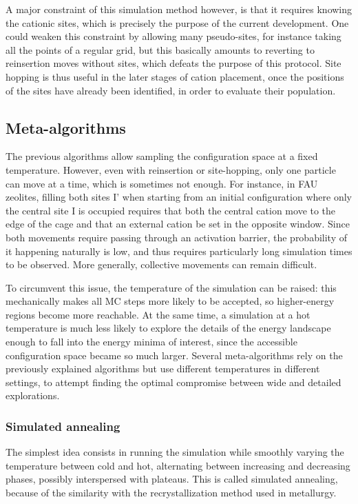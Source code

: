 \documentclass[main.tex]{subfiles}
\begin{document}
A major constraint of this simulation method however, is that it requires knowing the cationic sites, which is precisely the purpose of the current development. One could weaken this constraint by allowing many pseudo-sites, for instance taking all the points of a regular grid, but this basically amounts to reverting to reinsertion moves without sites, which defeats the purpose of this protocol. Site hopping is thus useful in the later stages of cation placement, once the positions of the sites have already been identified, in order to evaluate their population.


\subsection{Meta-algorithms}

The previous algorithms allow sampling the configuration space at a fixed temperature. However, even with reinsertion or site-hopping, only one particle can move at a time, which is sometimes not enough. For instance, in FAU zeolites, filling both sites I' when starting from an initial configuration where only the central site I is occupied requires that both the central cation move to the edge of the cage and that an external cation be set in the opposite window. Since both movements require passing through an activation barrier, the probability of it happening naturally is low, and thus requires particularly long simulation times to be observed. More generally, collective movements can remain difficult.

To circumvent this issue, the temperature of the simulation can be raised: this mechanically makes all MC steps more likely to be accepted, so higher-energy regions become more reachable. At the same time, a simulation at a hot temperature is much less likely to explore the details of the energy landscape enough to fall into the energy minima of interest, since the accessible configuration space became so much larger. Several meta-algorithms rely on the previously explained algorithms but use different temperatures in different settings, to attempt finding the optimal compromise between wide and detailed explorations.

\subsubsection{Simulated annealing}

The simplest idea consists in running the simulation while smoothly varying the temperature between cold and hot, alternating between increasing and decreasing phases, possibly interspersed with plateaus. This is called simulated annealing, because of the similarity with the recrystallization method used in metallurgy.
\end{document}
